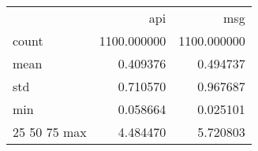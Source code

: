 \begin{tabular}{lrr}
 & api & msg \\
count & 1100.000000 & 1100.000000 \\
mean & 0.409376 & 0.494737 \\
std & 0.710570 & 0.967687 \\
min & 0.058664 & 0.025101 \\
25%
50%
75%
max & 4.484470 & 5.720803 \\
\end{tabular}
